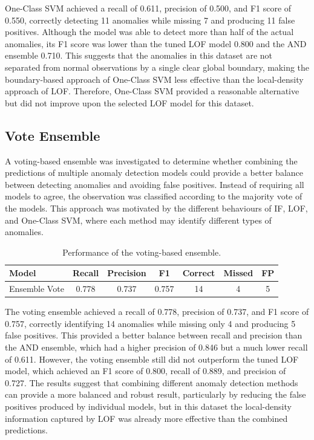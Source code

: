 \documentclass[a4paper,12pt]{article}
\begin{document}
One-Class SVM achieved a recall of 0.611, precision of 0.500, and F1 score of 0.550, correctly detecting 11 anomalies while missing 7 and producing 11 false positives. Although the model was able to detect more than half of the actual anomalies, its F1 score was lower than the tuned LOF model 0.800 and the AND ensemble 0.710. This suggests that the anomalies in this dataset are not separated from normal observations by a single clear global boundary, making the boundary-based approach of One-Class SVM less effective than the local-density approach of LOF. Therefore, One-Class SVM provided a reasonable alternative but did not improve upon the selected LOF model for this dataset.

\subsection{Vote Ensemble}

A voting-based ensemble was investigated to determine whether combining the predictions of multiple anomaly detection models could provide a better balance between detecting anomalies and avoiding false positives. Instead of requiring all models to agree, the observation was classified according to the majority vote of the models. This approach was motivated by the different behaviours of IF, LOF, and One-Class SVM, where each method may identify different types of anomalies.

\begin{table}
	\centering
	\small
	\setlength{\tabcolsep}{5pt}
	\caption{Performance of the voting-based ensemble.}
	\label{tab:ensemble_vote}
	\begin{tabular}{lcccccc}
		\hline
		Model & Recall & Precision & F1 & Correct & Missed & FP \\
		\hline
		Ensemble Vote & 0.778 & 0.737 & 0.757 & 14 & 4 & 5 \\
		\hline
	\end{tabular}
\end{table}

The voting ensemble achieved a recall of 0.778, precision of 0.737, and F1 score of 0.757, correctly identifying 14 anomalies while missing only 4 and producing 5 false positives. This provided a better balance between recall and precision than the AND ensemble, which had a higher precision of 0.846 but a much lower recall of 0.611. However, the voting ensemble still did not outperform the tuned LOF model, which achieved an F1 score of 0.800, recall of 0.889, and precision of 0.727. The results suggest that combining different anomaly detection methods can provide a more balanced and robust result, particularly by reducing the false positives produced by individual models, but in this dataset the local-density information captured by LOF was already more effective than the combined predictions.
\end{document}
